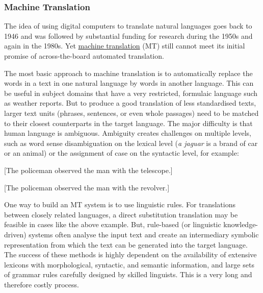 \begin{multicols}{2}
\subsubsection{Machine Translation}

The idea of using digital computers to translate natural languages goes back to 1946 and was followed by substantial funding for research during the 1950s and again in the 1980s. Yet \uline{machine translation} (MT) still cannot meet its initial promise of across-the-board automated translation.  

The most basic approach to machine translation is to automatically replace the words in a text in one natural language by words in another language. This can be useful in subject domains that have a very restricted, formulaic language such as weather reports. But to produce a good translation of less standardised texts, larger text units (phrases, sentences, or even whole passages) need to be matched to their closest counterparts in the target language. The major difficulty is that human language is ambiguous. Ambiguity creates challenges on multiple levels, such as word sense disambiguation on the lexical level ({\it a jaguar} is a brand of car or an animal) or the assignment of case on the syntactic level, for example:

{\it
\hspace{0.5cm}{Politsayat nablyudava prestapnika s tele-skopa.}
}

\hspace{0.5cm}[The policeman observed the man with the telescope.]

{\it
\hspace{0.5cm}{Politsayat nablyudava prestapnika s pistoleta.}
}

\hspace{0.5cm}[The policeman observed the man with the revolver.]


One way to build an MT system is to use linguistic rules. For translations between closely related languages, a direct substitution translation may be feasible in cases like the above example. But, rule-based (or linguistic knowledge-driven) systems often analyse the input text and create an intermediary symbolic representation from which the text can be generated into the target language. The success of these methods is highly dependent on the availability of extensive lexicons with morphological, syntactic, and semantic information, and large sets of grammar rules carefully designed by skilled linguists. This is a very long and therefore costly process.


\end{multicols}
